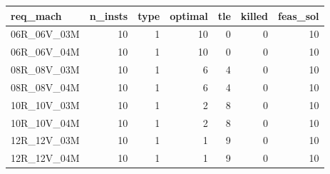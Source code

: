 
\begin{tabular}{lrrrrrr}
\toprule
req\_mach & n\_insts & type & optimal & tle & killed & feas\_sol\\
\midrule
06R\_06V\_03M & 10 & 1 & 10 & 0 & 0 & 10\\
06R\_06V\_04M & 10 & 1 & 10 & 0 & 0 & 10\\
08R\_08V\_03M & 10 & 1 & 6 & 4 & 0 & 10\\
08R\_08V\_04M & 10 & 1 & 6 & 4 & 0 & 10\\
10R\_10V\_03M & 10 & 1 & 2 & 8 & 0 & 10\\
\addlinespace
10R\_10V\_04M & 10 & 1 & 2 & 8 & 0 & 10\\
12R\_12V\_03M & 10 & 1 & 1 & 9 & 0 & 10\\
12R\_12V\_04M & 10 & 1 & 1 & 9 & 0 & 10\\
\bottomrule
\end{tabular}
